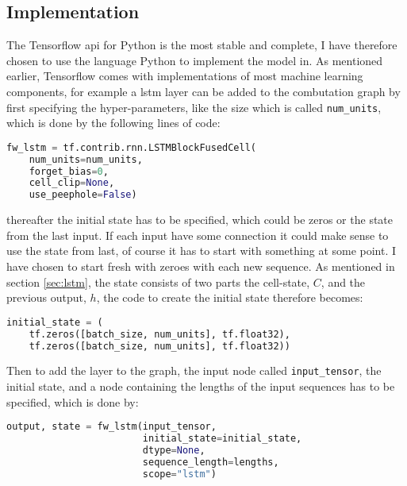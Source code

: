 \subsection{Implementation}
The Tensorflow api for Python is the most stable and complete, I have therefore chosen to use 
the language Python to implement the model in. As mentioned earlier, Tensorflow comes with 
implementations of most machine learning components, for example a \gls{lstm} layer can 
be added to the combutation graph by first specifying the hyper-parameters, like the size
which is called \texttt{num\_units}, which is done by the following lines of code:

\begin{lstlisting}[language=Python]
fw_lstm = tf.contrib.rnn.LSTMBlockFusedCell(
    num_units=num_units,
    forget_bias=0,
    cell_clip=None,
    use_peephole=False)
\end{lstlisting}

thereafter the initial state has to be specified, which could be zeros or the state from the last 
input. If each input have some connection it could make sense to use the state from last, 
of course it has to start with something at some point. I have chosen to start fresh with zeroes 
with each new sequence. As mentioned in section \ref{sec:lstm}, the state consists of two parts
the cell-state, $C$, and the previous output, $h$, the code to create the initial state therefore 
becomes:

\begin{lstlisting}[language=Python]
initial_state = (
    tf.zeros([batch_size, num_units], tf.float32),
    tf.zeros([batch_size, num_units], tf.float32))
\end{lstlisting}

Then to add the layer to the graph, the input node called \texttt{input\_tensor}, the initial state, 
and a node containing the lengths of the input sequences has to be specified, which is done by:

\begin{lstlisting}[language=Python]
output, state = fw_lstm(input_tensor,
                        initial_state=initial_state,
                        dtype=None,
                        sequence_length=lengths,
                        scope="lstm")
\end{lstlisting}

